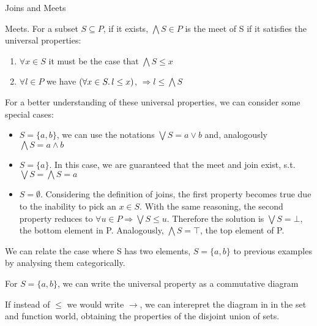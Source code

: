 \begin{section}{Joins and Meets}
\begin{definition}\label{defmeets}{Meets.}
    For a subset $S \subseteq P$, if it exists, $\bigwedge S \in P$ is the meet of S if 
    it satisfies the universal properties:
        \begin{enumerate} 
            \item $\forall x \in S$ it must be the case that $ \bigwedge S \leq x$
            \item $\forall l \in P$ we have $(\forall x \in S \ldotp l \leq x)$, $ \Rightarrow l \leq \bigwedge S$    
        \end{enumerate}
\end{definition}
For a better understanding of these universal properties, we can consider some 
special cases:
\begin{itemize}
    \item $S = \{a, b\}$, we can use the notations $\bigvee S = a \vee b$ 
        and, analogously $\bigwedge S = a \wedge b$
    \item $S = \{a\}$. In this case, we are guaranteed that the meet and 
        join exist, s.t. $\bigvee S = \bigwedge S = a$
    \item $S = \emptyset$. Considering the definition of joins,
        the first property becomes true due to the inability to pick an $x \in S$. With the same reasoning, the second property reduces to $\forall u \in P \Rightarrow \bigvee S \leq u$.
        Therefore the solution is $\bigvee S = \bot$, the bottom element in P.
        Analogously, $\bigwedge S = \top$, the top element of P.
\end{itemize} 

We can relate the case where S has two elements, $S = \{a, b\}$ to previous
examples by analysing them categorically.

For $S = \{a, b\}$, we can write the universal property as a commutative diagram 

\begin{center}
\end{center}

If instead of $\leq$ we would write $\rightarrow$, we can interepret the diagram in
in the set and function world, obtaining the properties of the disjoint union of sets.


\end{section}
